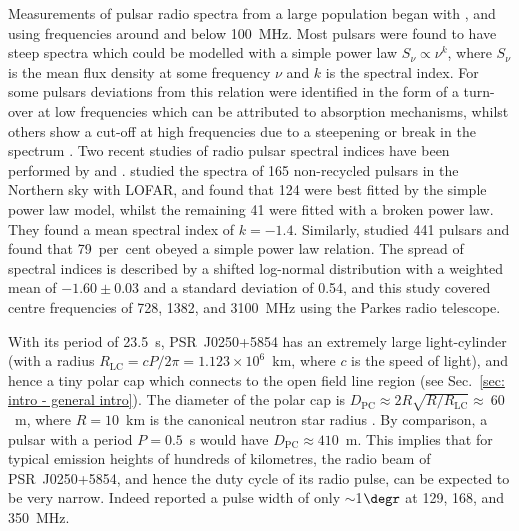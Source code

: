 Measurements of pulsar radio spectra from a large population began with \citet{Sxxx1973}, \citet{MMxx1980} and \citet{IKMS1981} using frequencies around and below 100~MHz. Most pulsars were found to have steep spectra which could be modelled with a simple power law $S_\nu \propto \nu^k$, where $S_\nu$ is the mean flux density at some frequency $\nu$ and $k$ is the spectral index. For some pulsars deviations from this relation were identified in the form of a turn-over at low frequencies which can be attributed to absorption mechanisms, whilst others show a cut-off at high frequencies due to a steepening or break in the spectrum \citep{Sxxx1973}. Two recent studies of radio pulsar spectral indices have been performed by \citet{BKK+2016} and \citet{JSK+2018}. \citet{BKK+2016} studied the spectra of 165 non-recycled pulsars in the Northern sky with LOFAR, and found that 124 were best fitted by the simple power law model, whilst the remaining 41 were fitted with a broken power law. They found a mean spectral index of $k = -1.4$. Similarly, \citet{JSK+2018} studied 441 pulsars and found that 79~per~cent obeyed a simple power law relation. The spread of spectral indices is described by a shifted log-normal distribution with a weighted mean of $-1.60\pm0.03$ and a standard deviation of 0.54, and this study covered centre frequencies of 728, 1382, and 3100~MHz using the Parkes radio telescope.

With its period of 23.5~s, PSR~J0250+5854 has an extremely large light-cylinder (with a radius $R_\mathrm{LC} = cP/2\pi =  1.123\times10^{6}$~km, where $c$ is the speed of light), and hence a tiny polar cap which connects to the open field line region (see Sec.~\ref{sec: intro - general intro}). The diameter of the polar cap is $D_\mathrm{PC} \approx 2R\sqrt{R/R_\mathrm{LC}} \approx~60$~m, where $R = 10$~km is the canonical neutron star radius \citep[e.g.][]{Sxxx1971}. By comparison, a pulsar with a period $P = 0.5$~s would have $D_\mathrm{PC} \approx 410$~m. This implies that for typical emission heights of hundreds of kilometres, the radio beam of PSR~J0250+5854, and hence the duty cycle of its radio pulse, can be expected to be very narrow. Indeed \citet{TBC+2018} reported a pulse width of only $\sim$1$\degr$ at 129, 168, and 350~MHz. 


